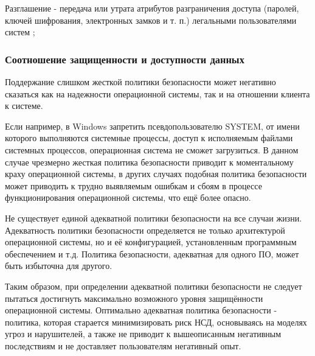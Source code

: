Разглашение - передача или утрата атрибутов разграничения доступа (паролей, ключей шифрования, электронных замков и т. п.) легальными пользователями систем \cite{Smirnov2007};

\subsubsection{Соотношение защищенности и доступности данных}
Поддержание слишком жесткой политики безопасности может негативно
сказаться как на надежности операционной системы,
так и на отношении клиента к системе.

Если например, в Windows запретить псевдопользователю SYSTEM, от имени которого выполняются
системные процессы, доступ к исполняемым файлами системных процессов, операционная система не
сможет загрузиться. В данном случае чрезмерно жесткая политика безопасности приводит к
моментальному краху операционной системы, в других случаях подобная политика безопасности может
приводить к трудно выявляемым ошибкам и сбоям в процессе функционирования операционной системы,
что ещё более опасно.

Не существует единой адекватной политики безопасности на все случаи жизни. Адекватность политики
безопасности определяется не только архитектурой операционной системы, но и её
конфигурацией, установленным программным обеспечением и т.д. Политика безопасности,
адекватная для одного ПО, может быть избыточна для другого.

Таким образом, при определении адекватной политики безопасности не следует пытаться достигнуть
максимально возможного уровня защищённости операционной системы. Оптимально адекватная политика
безопасности - политика, которая старается минимизировать риск НСД, основываясь на моделях угроз и нарушителей, а
также не приводит к вышеописанным негативным последствиям и не доставляет пользователям негативный опыт.

